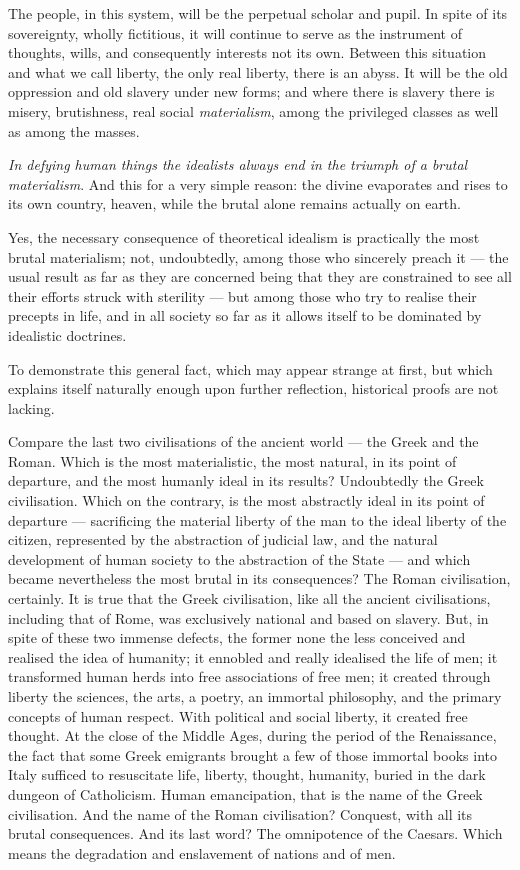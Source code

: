 \documentclass[12pt]{report}
\begin{document}
The people, in this system, will be the perpetual scholar and pupil. In spite of its sovereignty, wholly fictitious, it will continue to serve as the instrument of thoughts, wills, and consequently interests not its own. Between this situation and what we call liberty, the only real liberty, there is an abyss. It will be the old oppression and old slavery under new forms; and where there is slavery there is misery, brutishness, real social \emph{materialism}, among the privileged classes as well as among the masses.


\emph{In defying human things the idealists always end in the triumph of a brutal materialism}. And this for a very simple reason: the divine evaporates and rises to its own country, heaven, while the brutal alone remains actually on earth.


Yes, the necessary consequence of theoretical idealism is practically the most brutal materialism; not, undoubtedly, among those who sincerely preach it — the usual result as far as they are concerned being that they are constrained to see all their efforts struck with sterility — but among those who try to realise their precepts in life, and in all society so far as it allows itself to be dominated by idealistic doctrines.


To demonstrate this general fact, which may appear strange at first, but which explains itself naturally enough upon further reflection, historical proofs are not lacking.


Compare the last two civilisations of the ancient world — the Greek and the Roman. Which is the most materialistic, the most natural, in its point of departure, and the most humanly ideal in its results? Undoubtedly the Greek civilisation. Which on the contrary, is the most abstractly ideal in its point of departure — sacrificing the material liberty of the man to the ideal liberty of the citizen, represented by the abstraction of judicial law, and the natural development of human society to the abstraction of the State — and which became nevertheless the most brutal in its consequences? The Roman civilisation, certainly. It is true that the Greek civilisation, like all the ancient civilisations, including that of Rome, was exclusively national and based on slavery. But, in spite of these two immense defects, the former none the less conceived and realised the idea of humanity; it ennobled and really idealised the life of men; it transformed human herds into free associations of free men; it created through liberty the sciences, the arts, a poetry, an immortal philosophy, and the primary concepts of human respect. With political and social liberty, it created free thought. At the close of the Middle Ages, during the period of the Renaissance, the fact that some Greek emigrants brought a few of those immortal books into Italy sufficed to resuscitate life, liberty, thought, humanity, buried in the dark dungeon of Catholicism. Human emancipation, that is the name of the Greek civilisation. And the name of the Roman civilisation? Conquest, with all its brutal consequences. And its last word? The omnipotence of the Caesars. Which means the degradation and enslavement of nations and of men.
\end{document}
